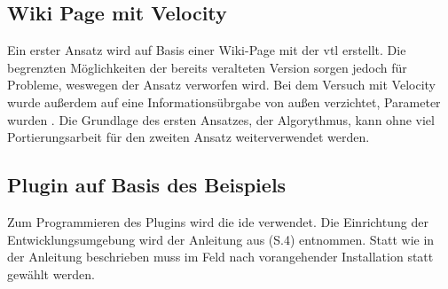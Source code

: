 \subsection{Wiki Page mit Velocity}
\label{sub:wikivelo}
Ein erster Ansatz wird auf Basis einer Wiki-Page mit der \ac{vtl} erstellt. Die begrenzten Möglichkeiten der bereits veralteten Version sorgen jedoch für Probleme, weswegen der Ansatz verworfen wird. Bei dem Versuch mit Velocity wurde außerdem auf eine Informationsübrgabe von außen verzichtet, Parameter wurden .
Die Grundlage des ersten Ansatzes, der Algorythmus, kann ohne viel Portierungsarbeit für den zweiten Ansatz weiterverwendet werden.
\newpage
\subsection{Plugin auf Basis des Beispiels }
\label{sub:servlet}
Zum Programmieren des Plugins wird die \ac{ide}  verwendet. Die Einrichtung der Entwicklungsumgebung wird der Anleitung aus \cite{17}(S.4) entnommen. Statt wie in der Anleitung beschrieben muss im Feld  nach vorangehender Installation  statt  gewählt werden.
